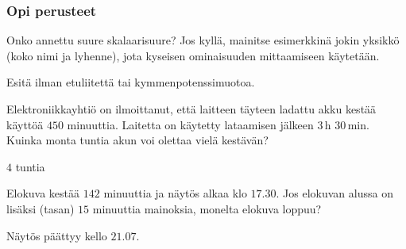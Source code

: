 \begin{tehtavasivu}

\subsubsection*{Opi perusteet}

\begin{tehtava}
Onko annettu suure skalaarisuure? Jos kyllä, mainitse esimerkkinä jokin yksikkö (koko nimi ja lyhenne), jota kyseisen ominaisuuden mittaamiseen käytetään.
\begin{vastaus}
\end{vastaus}
\end{tehtava}

\begin{tehtava}
Esitä ilman etuliitettä tai kymmenpotenssimuotoa.
	\begin{vastaus}
	\end{vastaus}
\end{tehtava}

	\begin{tehtava}
Elektroniikkayhtiö on ilmoittanut, että laitteen täyteen ladattu akku kestää käyttöä $450$ minuuttia. Laitetta on käytetty lataamisen jälkeen $3$\,h $30$\,min. Kuinka monta tuntia akun voi olettaa vielä kestävän?
\begin{vastaus}
$4$ tuntia
	\end{vastaus}
\end{tehtava}

\begin{tehtava}
Elokuva kestää $142$ minuuttia ja näytös alkaa klo $17.30$. Jos elokuvan alussa on lisäksi (tasan) $15$ minuuttia mainoksia, monelta elokuva loppuu?
	\begin{vastaus}
	Näytös päättyy kello $21.07$.
	\end{vastaus}
\end{tehtava}


\end{tehtavasivu}

